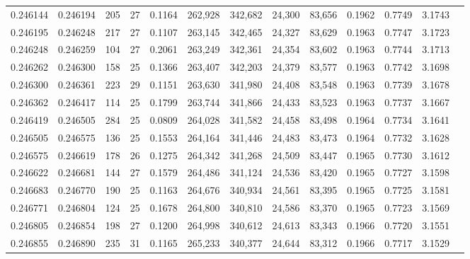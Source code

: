 \begin{tabular}{rrrrrrrrrrrrr}
0.246144 & 0.246194 &   205 &  27 &                                     0.1164 & 262,928 & 342,682 &  24,300 &  83,656 & 0.1962 & 0.7749 & 3.1743 \\
0.246195 & 0.246248 &   217 &  27 &                                     0.1107 & 263,145 & 342,465 &  24,327 &  83,629 & 0.1963 & 0.7747 & 3.1723 \\
0.246248 & 0.246259 &   104 &  27 &                                     0.2061 & 263,249 & 342,361 &  24,354 &  83,602 & 0.1963 & 0.7744 & 3.1713 \\
0.246262 & 0.246300 &   158 &  25 &                                     0.1366 & 263,407 & 342,203 &  24,379 &  83,577 & 0.1963 & 0.7742 & 3.1698 \\
0.246300 & 0.246361 &   223 &  29 &                                     0.1151 & 263,630 & 341,980 &  24,408 &  83,548 & 0.1963 & 0.7739 & 3.1678 \\
0.246362 & 0.246417 &   114 &  25 &                                     0.1799 & 263,744 & 341,866 &  24,433 &  83,523 & 0.1963 & 0.7737 & 3.1667 \\
0.246419 & 0.246505 &   284 &  25 &                                     0.0809 & 264,028 & 341,582 &  24,458 &  83,498 & 0.1964 & 0.7734 & 3.1641 \\
0.246505 & 0.246575 &   136 &  25 &                                     0.1553 & 264,164 & 341,446 &  24,483 &  83,473 & 0.1964 & 0.7732 & 3.1628 \\
0.246575 & 0.246619 &   178 &  26 &                                     0.1275 & 264,342 & 341,268 &  24,509 &  83,447 & 0.1965 & 0.7730 & 3.1612 \\
0.246622 & 0.246681 &   144 &  27 &                                     0.1579 & 264,486 & 341,124 &  24,536 &  83,420 & 0.1965 & 0.7727 & 3.1598 \\
0.246683 & 0.246770 &   190 &  25 &                                     0.1163 & 264,676 & 340,934 &  24,561 &  83,395 & 0.1965 & 0.7725 & 3.1581 \\
0.246771 & 0.246804 &   124 &  25 &                                     0.1678 & 264,800 & 340,810 &  24,586 &  83,370 & 0.1965 & 0.7723 & 3.1569 \\
0.246805 & 0.246854 &   198 &  27 &                                     0.1200 & 264,998 & 340,612 &  24,613 &  83,343 & 0.1966 & 0.7720 & 3.1551 \\
0.246855 & 0.246890 &   235 &  31 &                                     0.1165 & 265,233 & 340,377 &  24,644 &  83,312 & 0.1966 & 0.7717 & 3.1529 \\

\end{tabular}
